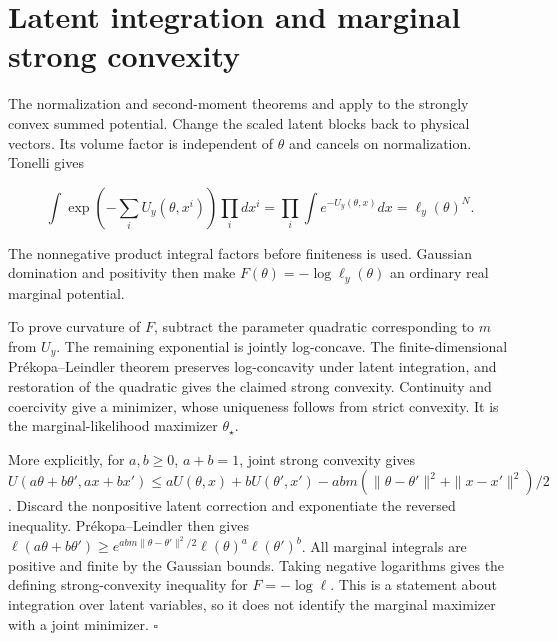 \documentclass[11pt,a4paper]{article}
\begin{document}
\section{\texorpdfstring{Latent integration and marginal strong convexity}{Latent integration and marginal strong convexity}}



The normalization and second-moment theorems \cite[Section~3.26.13]{LangevinLean2026ULASC} and \cite[Section~3.26.14]{LangevinLean2026ULASC} apply to the strongly convex summed potential. Change the scaled latent blocks back to physical vectors. Its volume factor is independent of \(\theta\) and cancels on normalization. Tonelli gives

\[\int\exp\!\left(-\sum_iU_y(\theta,x^i)\right)\prod_i dx^i
=\prod_i\int e^{-U_y(\theta,x)}dx=\ell_y(\theta)^N.\]

The nonnegative product integral factors before finiteness is used. Gaussian domination and positivity then make \(F(\theta)=-\log\ell_y(\theta)\) an ordinary real marginal potential.



To prove curvature of \(F\), subtract the parameter quadratic corresponding to \(m\) from \(U_y\). The remaining exponential is jointly log-concave. The finite-dimensional Prékopa–Leindler theorem preserves log-concavity under latent integration, and restoration of the quadratic gives the claimed strong convexity. Continuity and coercivity give a minimizer, whose uniqueness follows from strict convexity. It is the marginal-likelihood maximizer \(\theta_\star\).




More explicitly, for \(a,b\ge0\), \(a+b=1\), joint strong convexity gives \(U(a\theta+b\theta',ax+bx')\le aU(\theta,x)+bU(\theta',x')-abm(\|\theta-\theta'\|^2+\|x-x'\|^2)/2\). Discard the nonpositive latent correction and exponentiate the reversed inequality. Prékopa–Leindler then gives \(\ell(a\theta+b\theta')\ge e^{abm\|\theta-\theta'\|^2/2}\ell(\theta)^a\ell(\theta')^b\). All marginal integrals are positive and finite by the Gaussian bounds. Taking negative logarithms gives the defining strong-convexity inequality for \(F=-\log\ell\). This is a statement about integration over latent variables, so it does not identify the marginal maximizer with a joint minimizer. \(\square\)
\end{document}
